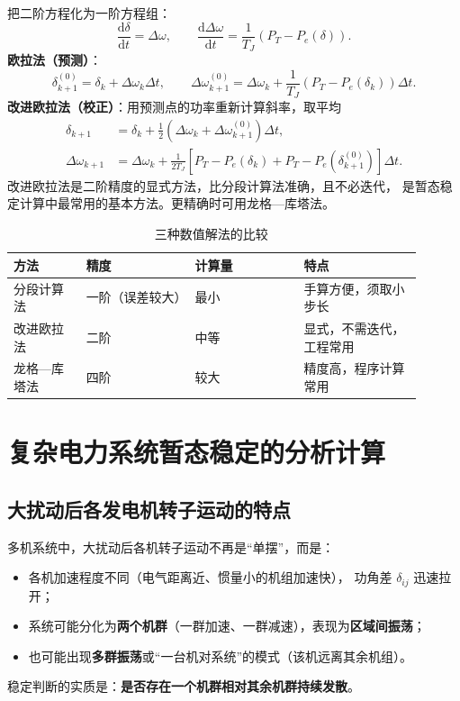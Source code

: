 把二阶方程化为一阶方程组：
\begin{equation}
  \frac{\mathrm{d}\delta}{\mathrm{d}t}=\Delta\omega,\qquad
  \frac{\mathrm{d}\Delta\omega}{\mathrm{d}t}=\frac{1}{T_J}\left(P_T-P_e(\delta)\right).
\end{equation}
\textbf{欧拉法（预测）}：
\begin{equation}
  \delta_{k+1}^{(0)}=\delta_k+\Delta\omega_k\Delta t,\qquad
  \Delta\omega_{k+1}^{(0)}=\Delta\omega_k+\frac{1}{T_J}\left(P_T-P_e(\delta_k)\right)\Delta t .
\end{equation}
\textbf{改进欧拉法（校正）}：用预测点的功率重新计算斜率，取平均
\begin{align}
  \delta_{k+1}&=\delta_k+\frac{1}{2}\left(\Delta\omega_k+\Delta\omega_{k+1}^{(0)}\right)\Delta t,\\
  \Delta\omega_{k+1}&=\Delta\omega_k+\frac{1}{2T_J}
  \left[P_T-P_e\left(\delta_k\right)+P_T-P_e\left(\delta_{k+1}^{(0)}\right)\right]\Delta t .
\end{align}
改进欧拉法是二阶精度的显式方法，比分段计算法准确，且不必迭代，
是暂态稳定计算中最常用的基本方法。更精确时可用龙格—库塔法。

\begin{table}[htbp]
  \centering
  \caption{三种数值解法的比较}
  \small
  \begin{tabular}{@{}p{0.16\linewidth}p{0.24\linewidth}p{0.24\linewidth}p{0.26\linewidth}@{}}
    \toprule
    方法 & 精度 & 计算量 & 特点 \\
    \midrule
    分段计算法 & 一阶（误差较大） & 最小 & 手算方便，须取小步长 \\
    改进欧拉法 & 二阶 & 中等 & 显式，不需迭代，工程常用 \\
    龙格—库塔法 & 四阶 & 较大 & 精度高，程序计算常用 \\
    \bottomrule
  \end{tabular}
\end{table}

\section{复杂电力系统暂态稳定的分析计算}

\subsection{大扰动后各发电机转子运动的特点}

多机系统中，大扰动后各机转子运动不再是“单摆”，而是：
\begin{itemize}
  \item 各机加速程度不同（电气距离近、惯量小的机组加速快），
        功角差 $\delta_{ij}$ 迅速拉开；
  \item 系统可能分化为\textbf{两个机群}（一群加速、一群减速），表现为\textbf{区域间振荡}；
  \item 也可能出现\textbf{多群振荡}或“一台机对系统”的模式（该机远离其余机组）。
\end{itemize}
稳定判断的实质是：\textbf{是否存在一个机群相对其余机群持续发散}。

